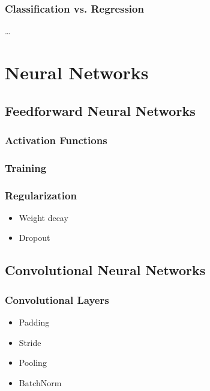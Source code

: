 \subsubsection{Classification vs. Regression}

\dots

\section{Neural Networks}

\subsection{Feedforward Neural Networks}

\subsubsection{Activation Functions}

\subsubsection{Training}

\subsubsection{Regularization}

\begin{itemize}
    \item Weight decay
    \item Dropout
\end{itemize}

\subsection{Convolutional Neural Networks}

\subsubsection{Convolutional Layers}

\begin{itemize}
    \item Padding
    \item Stride
    \item Pooling
    \item BatchNorm
\end{itemize}



